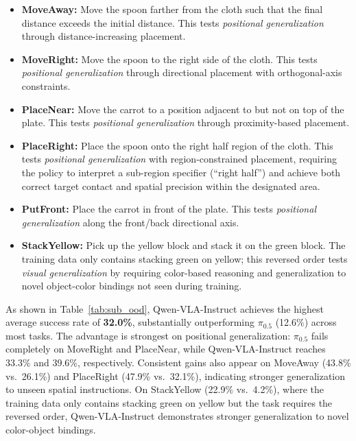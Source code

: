 \documentclass{article}
\begin{document}
\begin{itemize}[leftmargin=*,itemsep=2pt]      
      \item \textbf{MoveAway:} Move the spoon farther from the cloth such that the final distance exceeds the initial distance. This tests \textit{positional generalization} through distance-increasing placement.
      
      \item \textbf{MoveRight:} Move the spoon to the right side of the cloth. This tests \textit{positional generalization} through directional placement with orthogonal-axis constraints.                     

      \item \textbf{PlaceNear:} Move the carrot to a position adjacent to but not on top of the plate. This tests \textit{positional generalization} through proximity-based placement.
      
      \item \textbf{PlaceRight:} Place the spoon onto the right half region of the cloth. This tests \textit{positional generalization} with region-constrained placement, requiring the policy to interpret a sub-region specifier (``right half'') and achieve both correct target contact and
   spatial precision within the designated area.            

      \item \textbf{PutFront:} Place the carrot in front of the plate. This tests \textit{positional generalization} along the front/back directional axis.

      \item \textbf{StackYellow:} Pick up the yellow block and stack it on the green block. The training data only contains stacking green on yellow; this reversed order tests \textit{visual generalization} by requiring color-based reasoning and generalization to novel object-color bindings not seen during training.
  \end{itemize}

As shown in Table~\ref{tab:sub_ood}, Qwen-VLA-Instruct achieves the highest average success rate of \textbf{32.0\%}, substantially outperforming $\pi_{0.5}$ (12.6\%) across most tasks. The
advantage is strongest on positional generalization: $\pi_{0.5}$ fails completely on MoveRight and PlaceNear, while Qwen-VLA-Instruct reaches 33.3\% and 39.6\%, respectively. Consistent
gains also appear on MoveAway (43.8\% vs.\ 26.1\%) and PlaceRight (47.9\% vs.\ 32.1\%), indicating stronger generalization to unseen spatial instructions.
On StackYellow (22.9\% vs.\ 4.2\%), where the training data only contains stacking green on yellow but the task requires the reversed order, Qwen-VLA-Instruct demonstrates stronger generalization
to novel color-object bindings.
\end{document}
